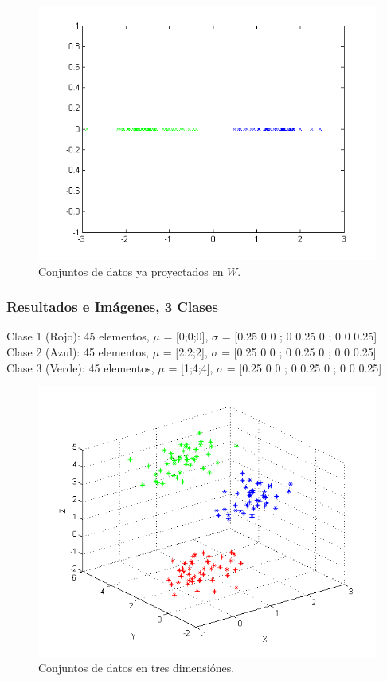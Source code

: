 \begin{figure}[ht!]
\centering
\includegraphics[width=120mm]{img/tp4/ej3-2.png}
\caption{Conjuntos de datos ya proyectados en $W$.}
\end{figure}

\subsubsection{Resultados e Imágenes, 3 Clases}

Clase 1 (Rojo): 45 elementos, $\mu$ = [0;0;0], $\sigma$ = [0.25 0 0 ; 0 0.25 0 ; 0 0 0.25]\\
Clase 2 (Azul): 45 elementos, $\mu$ = [2;2;2], $\sigma$ = [0.25 0 0 ; 0 0.25 0 ; 0 0 0.25]\\
Clase 3 (Verde): 45 elementos, $\mu$ = [1;4;4], $\sigma$ = [0.25 0 0 ; 0 0.25 0 ; 0 0 0.25]

\begin{figure}[ht!]
\centering
\includegraphics[width=120mm]{img/tp4/ej3-3.png}
\caption{Conjuntos de datos en tres dimensiónes.}
\end{figure}

